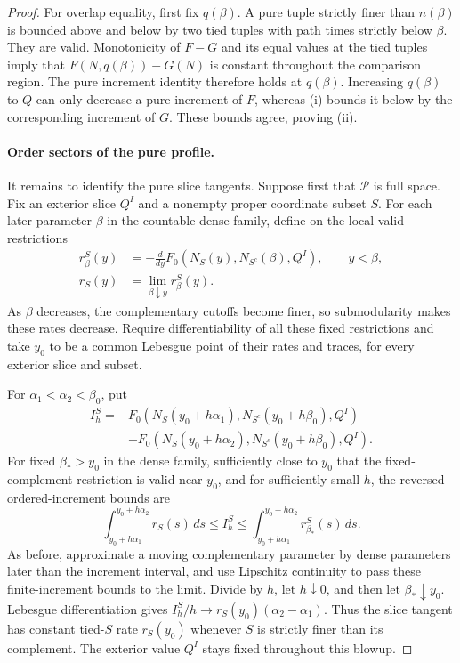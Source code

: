 \begin{proof}
For overlap equality, first fix $q(\beta)$.  A pure tuple
strictly finer than $n(\beta)$ is bounded above and below by
two tied tuples with path times strictly below $\beta$.
They are valid.  Monotonicity of $F-G$ and its equal values at
the tied tuples imply that $F(N,q(\beta))-G(N)$ is constant
throughout the comparison region.  The pure increment identity
therefore holds at $q(\beta)$.  Increasing $q(\beta)$ to $Q$
can only decrease a pure increment of $F$, whereas (i) bounds
it below by the corresponding increment of $G$.  These bounds
agree, proving (ii).

\paragraph{Order sectors of the pure profile.}
It remains to identify the pure slice tangents.  Suppose first
that $\mathcal P$ is full space.  Fix an exterior slice $Q^I$
and a nonempty proper coordinate subset $S$.  For each later
parameter $\beta$ in the countable dense family, define on the
local valid restrictions
\begin{align*}
r^S_\beta(y)&=-\frac{d}{dy}
 F_0(N_S(y),N_{S^c}(\beta),Q^I),\qquad y<\beta,\\
r_S(y)&=\lim_{\beta\downarrow y}r^S_\beta(y).
\end{align*}
As $\beta$ decreases, the complementary cutoffs become finer,
so submodularity makes these rates decrease.  Require
differentiability of all these fixed restrictions and take
$y_0$ to be a common Lebesgue point of their rates and traces,
for every exterior slice and subset.

For $\alpha_1<\alpha_2<\beta_0$, put
\begin{align*}
I_h^S={}&F_0(N_S(y_0+h\alpha_1),N_{S^c}(y_0+h\beta_0),Q^I)\\
&-F_0(N_S(y_0+h\alpha_2),N_{S^c}(y_0+h\beta_0),Q^I).
\end{align*}
For fixed $\beta_*>y_0$ in the dense family, sufficiently close
to $y_0$ that the fixed-complement restriction is valid near
$y_0$, and for sufficiently small $h$, the reversed
ordered-increment bounds are
\[
\int_{y_0+h\alpha_1}^{y_0+h\alpha_2}r_S(s)\,ds
\leq I_h^S\leq
\int_{y_0+h\alpha_1}^{y_0+h\alpha_2}r^S_{\beta_*}(s)\,ds.
\]
As before, approximate a moving complementary parameter by
dense parameters later than the increment interval, and use
Lipschitz continuity to pass these finite-increment bounds to
the limit.  Divide by $h$, let $h\downarrow0$, and then let
$\beta_*\downarrow y_0$.  Lebesgue differentiation gives
$I_h^S/h\to r_S(y_0)(\alpha_2-\alpha_1)$.  Thus the slice
tangent has constant tied-$S$ rate $r_S(y_0)$ whenever $S$
is strictly finer than its complement.  The exterior value
$Q^I$ stays fixed throughout this blowup.


\end{proof}
